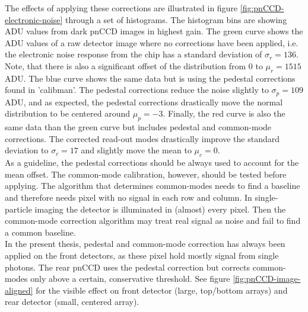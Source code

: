%
The effects of applying these corrections are illustrated in figure \ref{fig:pnCCD-electronic-noise} through a set of histograms. The histogram bins are showing ADU values from dark pnCCD images in highest gain. The green curve shows the ADU values of a raw detector image where no corrections have been applied, i.e. the electronic noise response from the chip has a standard deviation of $\sigma_{r}=136$. Note, that there is also a significant offset of the distribution from 0 to $\mu_{r}=1515$ ADU. The blue curve shows the same data but is using the pedestal corrections found in 'calibman'. The pedestal corrections reduce the noise slightly to $\sigma_{p}=109$ ADU, and as expected, the pedestal corrections drastically move the normal distribution to be centered around $\mu_{p}=-3$. Finally, the red curve is also the same data than the green curve but includes pedestal and common-mode corrections. The corrected read-out modes drastically improve the standard deviation to $\sigma_{c}=17$ and slightly move the mean to $\mu_{c}=0$.\\
As a guideline, the pedestal corrections should be always used to account for the mean offset. The common-mode calibration, however, should be tested before applying. The algorithm that determines common-modes needs to find a baseline and therefore needs pixel with no signal in each row and column. In single-particle imaging the detector is illuminated in (almost) every pixel. Then the common-mode correction algorithm may treat real signal as noise and fail to find a common baseline.\\
In the present thesis, pedestal and common-mode correction has always been applied on the front detectors, as these pixel hold mostly signal from single photons. The rear pnCCD uses the pedestal correction but corrects common-modes only above a certain, conservative threshold. See figure \ref{fig:pnCCD-image-aligned} for the visible effect on front detector (large, top/bottom arrays) and rear detector (small, centered array).\\
%
%
%
%
%
%

